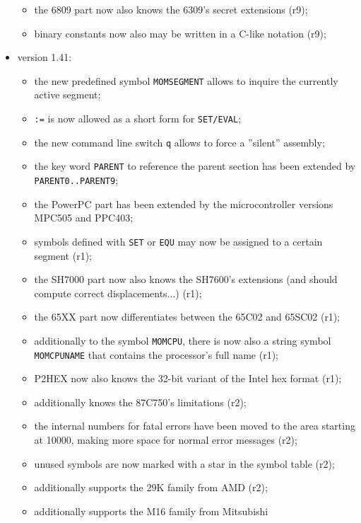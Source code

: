 \documentclass[12pt,twoside]{report}
\newcommand{\tty}[1]{{\tt #1}}
\begin{document}
\begin{itemize}
{\begin{itemize}
{            implications (pardon, r9);}
      \item{the 6809 part now also knows the 6309's secret
            extensions (r9);}
      \item{binary constants now also may be written in a C-like
            notation (r9);}
      \end{itemize}}
\item{version 1.41:
      \begin{itemize}
      \item{the new predefined symbol \tty{MOMSEGMENT} allows to
            inquire the currently active segment;}
      \item{\tty{:=} is now allowed as a short form for \tty{SET/EVAL};}
      \item{the new command line switch \tty{q} allows to force a
            ''silent'' assembly;}
      \item{the key word \tty{PARENT} to reference the parent section
            has been extended by \tty{PARENT0..PARENT9};}
      \item{the PowerPC part has been extended by the
            microcontroller versions MPC505 and PPC403;}
      \item{symbols defined with \tty{SET} or \tty{EQU} may now be assigned
            to a certain segment (r1);}
      \item{the SH7000 part now also knows the SH7600's
            extensions (and should compute correct
            displacements...) (r1);}
      \item{the 65XX part now differentiates between the 65C02
            and 65SC02 (r1);}
      \item{additionally to the symbol \tty{MOMCPU}, there is now also
            a string symbol \tty{MOMCPUNAME} that contains the
            processor's full name (r1);}
      \item{P2HEX now also knows the 32-bit variant of the Intel
            hex format (r1);}
      \item{additionally knows the 87C750's limitations (r2);}
      \item{the internal numbers for fatal errors have been moved
            to the area starting at 10000, making more space for
            normal error messages (r2);}
      \item{unused symbols are now marked with a star in the
            symbol table (r2);}
      \item{additionally supports the 29K family from AMD (r2);}
      \item{additionally supports the M16 family from Mitsubishi
}
\end{itemize}}
\end{itemize}
\end{document}
